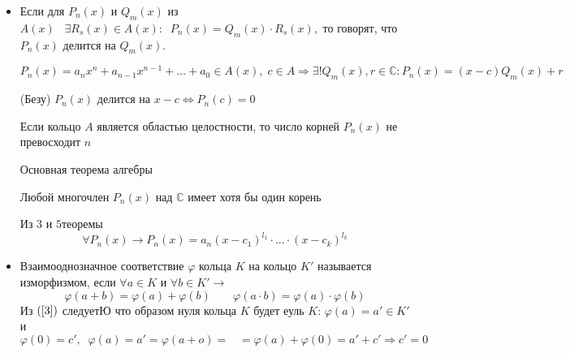 \begin{itemize}
    \begin{equation}
        L_n(p)\cdot M_m(p)K_s(p)(f)=(L_n(p)\cdot M_m(p))(K_s(p)(f))=L_n(p)(M_m(p)(K_s(p)(f)))= L_n(p)(Q_m(p)R_s(p))(f)
    \end{equation} ассоциативность. $$L_n(p)+M_m(p)K_s(p)(f)=L_n(p)(K_s(p)(f))+M_m(p)(K_s(p)(f))=(L_n(p)K_s(p))(f)+()M_m(p)K_s(p)(f)$$дистрибутивность $\cdot $ и $+$.\par
    Таким образом множество значений операторных многочленов является кольцом, которое содержится в $\varPhi$
    \item Если для $P_n(x)$ и $Q_m(x)$ из $A(x)\;\;\;\exists R_s(x)\in A(x): \;\;P_n(x)=Q_m(x)\cdot R_s(x),$ то говорят, что $P_n(x)$ делится на $Q_m(x)$.
    \begin{theorem}
    $$P_n(x) = a_n x^n + a_{n-1} x^{n-1} + \dots + a_0 \in A(x),\;c \in A \Rightarrow \exists ! Q_m(x), r\in \mathds{C}:P_n(x)=(x-c)Q_m(x)+r$$
    \end{theorem}
    \begin{theorem}
    (Безу) $P_n(x)$ делится на $x-c\Leftrightarrow P_n(c)=0$
    \end{theorem}
    \begin{theorem}
    Если кольцо $A$ является областью целостности, то число корней $P_n(x)$ не превосходит $n$
    \end{theorem}
    \begin{theorem}
    Основная теорема алгебры \par
    Любой многочлен $P_n(x)$ над $\mathds{C}$ имеет хотя бы один корень
    \end{theorem}
    \begin{proposition}
    Из $3$ и $5$теоремы \begin{equation}
        \forall P_n(x)\rightarrow P_n(x)=a_n(x-c_1)^{l_1}\cdot ... 
    \cdot (x-c_k)^{l_k} 
    \end{equation}
    \end{proposition}
    \item Взаимооднозначное соответствие $\varphi$ кольца $K$ на кольцо $K'$ называется изморфизмом, если $\forall a\in K $ и $\forall b\in K'\rightarrow$
    \begin{equation}
    \label{3}
        \varphi(a+b)=\varphi(a)+\varphi(b)\;\;\;\;\;\;\;\varphi(a\cdot b)=\varphi(a)\cdot\varphi(b)
    \end{equation}
    Из $(\ref{3})$ следуетЮ что образом нуля кольца $K$ будет еуль $K$: $\varphi(a)=a'\in K'$ и $\varphi(0)=c',\;\;\varphi(a)=a'=\varphi(a+o)=\;\;\;=\varphi(a)+\varphi(0)=a'+c'\Rightarrow c'=0$\par

\end{itemize}
